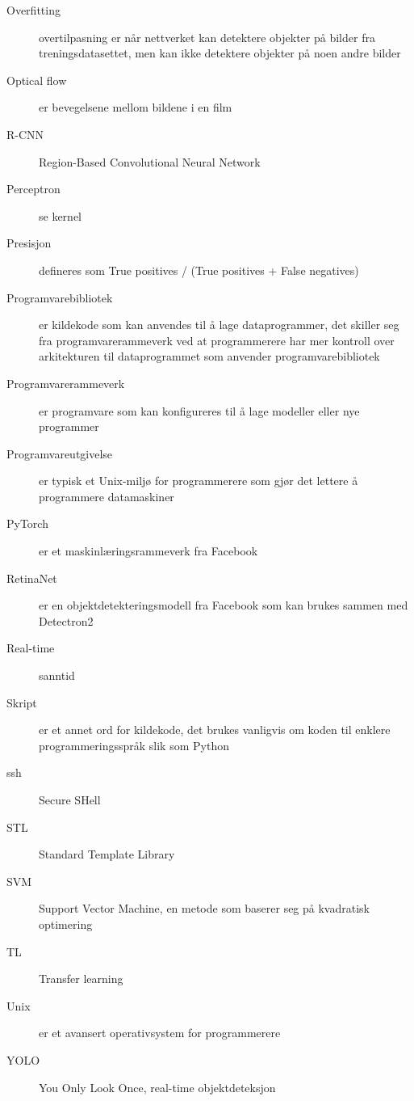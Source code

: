 \begin{description}
\item[Overfitting] overtilpasning er når nettverket kan detektere objekter på bilder fra treningsdatasettet, men kan ikke detektere objekter på noen andre bilder
\item[Optical flow] er bevegelsene mellom bildene i en film
\item[R-CNN] Region-Based Convolutional Neural Network
\item[Perceptron] se kernel
\item[Presisjon] defineres som True positives / (True positives + False negatives)
\item[Programvarebibliotek] er kildekode som kan anvendes til å lage dataprogrammer, det skiller seg fra programvarerammeverk ved at programmerere har mer kontroll over arkitekturen til dataprogrammet som anvender programvarebibliotek
\item[Programvarerammeverk] er programvare som kan konfigureres til å lage modeller eller nye programmer
\item[Programvareutgivelse] er typisk et Unix-miljø for programmerere som gjør det lettere å programmere datamaskiner
\item[PyTorch] er et maskinlæringsrammeverk fra Facebook
\item[RetinaNet] er en objektdetekteringsmodell fra Facebook som kan brukes sammen med Detectron2
\item[Real-time] sanntid
\item[Skript] er et annet ord for kildekode, det brukes vanligvis om koden til enklere programmeringsspråk slik som Python
\item[ssh] Secure SHell
\item[STL] Standard Template Library
\item[SVM] Support Vector Machine, en metode som baserer seg på kvadratisk optimering
\item[TL] Transfer learning
\item[Unix] er et avansert operativsystem for programmerere
\item[YOLO] You Only Look Once, real-time objektdeteksjon


\end{description}